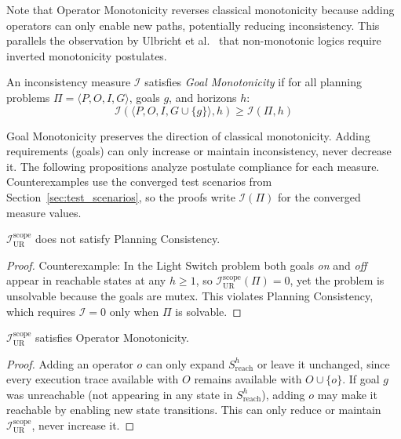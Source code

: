 Note that Operator Monotonicity reverses classical monotonicity because adding operators can only enable new paths, potentially reducing inconsistency. This parallels the observation by Ulbricht et al.~\cite{Ulbricht2016} that non-monotonic logics require inverted monotonicity postulates.

\begin{defn}
    An inconsistency measure $\mathcal{I}$ satisfies \emph{Goal Monotonicity} if for all planning problems $\Pi = \langle P, O, I, G \rangle$, goals $g$, and horizons $h$:
    \begin{equation*}
        \mathcal{I}(\langle P, O, I, G \cup \{g\} \rangle, h) \geq \mathcal{I}(\Pi, h)
    \end{equation*}
\end{defn}

Goal Monotonicity preserves the direction of classical monotonicity. Adding requirements (goals) can only increase or maintain inconsistency, never decrease it. The following propositions analyze postulate compliance for each measure. Counterexamples use the converged test scenarios from Section~\ref{sec:test_scenarios}, so the proofs write $\mathcal{I}(\Pi)$ for the converged measure values.

\begin{prop}
    $\mathcal{I}^{\text{scope}}_{\text{UR}}$ does not satisfy Planning Consistency.
\end{prop}
\begin{proof}
    Counterexample: In the Light Switch problem both goals \textit{on} and \textit{off} appear in reachable states at any $h \geq 1$, so $\mathcal{I}^{\text{scope}}_{\text{UR}}(\Pi) = 0$, yet the problem is unsolvable because the goals are mutex. This violates Planning Consistency, which requires $\mathcal{I} = 0$ only when $\Pi$ is solvable.
\end{proof}

\begin{prop}
    $\mathcal{I}^{\text{scope}}_{\text{UR}}$ satisfies Operator Monotonicity.
\end{prop}
\begin{proof}
    Adding an operator $o$ can only expand $S^h_{\text{reach}}$ or leave it unchanged, since every execution trace available with $O$ remains available with $O \cup \{o\}$. If goal $g$ was unreachable (not appearing in any state in $S^h_{\text{reach}}$), adding $o$ may make it reachable by enabling new state transitions. This can only reduce or maintain $\mathcal{I}^{\text{scope}}_{\text{UR}}$, never increase it.
\end{proof}

